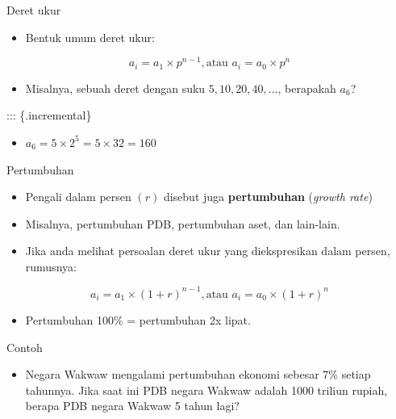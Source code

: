 \documentclass[
  ignorenonframetext,
]{beamer}
\providecommand{\tightlist}{%
  \setlength{\itemsep}{0pt}\setlength{\parskip}{0pt}}\usepackage{longtable,booktabs,array}
\begin{document}
\begin{frame}{Deret ukur}
\label{deret-ukur-1}
\begin{itemize}
\tightlist
\item
  Bentuk umum deret ukur:
\end{itemize}

\[
a_i=a_1\times p^{n-1}, \text{atau } a_i=a_0\times p^n
\]

\begin{itemize}
\tightlist
\item
  Misalnya, sebuah deret dengan suku \(5,10,20,40,...\), berapakah
  \(a_6\)?
\end{itemize}

::: \{.incremental\}

\begin{itemize}
\tightlist
\item
  \(a_6=5 \times 2^5=5 \times 32=160\)
\end{itemize}
\end{frame}

\begin{frame}{Pertumbuhan}
\label{pertumbuhan}
\begin{itemize}
\item
  Pengali dalam persen \((r)\) disebut juga \textbf{pertumbuhan}
  (\emph{growth rate})
\item
  Misalnya, pertumbuhan PDB, pertumbuhan aset, dan lain-lain.
\item
  Jika anda melihat persoalan deret ukur yang diekspresikan dalam
  persen, rumusnya:
\end{itemize}

\[
a_i=a_1\times (1+r)^{n-1}, \text{atau } a_i=a_0 \times (1+r)^{n}
\]

\begin{itemize}
\tightlist
\item
  Pertumbuhan 100\% = pertumbuhan 2x lipat.
\end{itemize}
\end{frame}

\begin{frame}{Contoh}
\label{contoh-4}
\begin{itemize}
\tightlist
\item
  Negara Wakwaw mengalami pertumbuhan ekonomi sebesar 7\% setiap
  tahunnya. Jika saat ini PDB negara Wakwaw adalah 1000 triliun rupiah,
  berapa PDB negara Wakwaw 5 tahun lagi?
\end{itemize}
\end{frame}
\end{document}
